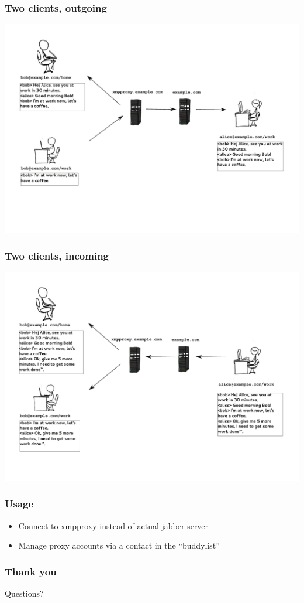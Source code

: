 \documentclass[notes=hide,yellow]{beamer}
\begin{document}
	\begin{frame}
		\frametitle{Two clients, outgoing}
		\includegraphics[scale=0.4]{../img/proxy2.pdf}
	\end{frame}
	
	\begin{frame}
		\frametitle{Two clients, incoming}
		\includegraphics[scale=0.4]{../img/proxy3.pdf}
	\end{frame}

	\begin{frame}
		\frametitle{Usage}
		\begin{itemize}
			\item Connect to xmpproxy instead of actual jabber server
			\item Manage proxy accounts via a contact in the ``buddylist'' 
		\end{itemize}
	\end{frame}
	\begin{frame}
		\frametitle{Thank you}
		\Large{Questions?}
	\end{frame}
\end{document}
